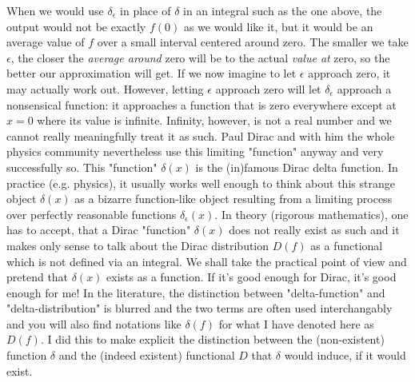 When we would use $\delta_{\epsilon}$ in place of $\delta$ in an integral such as the one above, the output would not be exactly $f(0)$ as we would like it, but it would be an average value of $f$ over a small interval centered around zero. The smaller we take $\epsilon$, the closer the \emph{average around} zero will be to the actual \emph{value at} zero, so the better our approximation will get. If we now imagine to let $\epsilon$ approach zero, it may actually work out. However, letting  $\epsilon$ approach zero will let $\delta_{\epsilon}$ approach a nonsensical function: it approaches a function that is zero everywhere except at $x=0$ where its value is infinite. Infinity, however, is not a real number and we cannot really meaningfully treat it as such. Paul Dirac and with him the whole physics community nevertheless use this limiting "function" anyway and very successfully so. This "function" $\delta(x)$ is the (in)famous Dirac delta function. In practice (e.g. physics), it usually works well enough to think about this strange object $\delta(x)$ as a bizarre function-like object resulting from a limiting process over perfectly reasonable functions $\delta_{\epsilon}(x)$. In theory (rigorous mathematics), one has to accept, that a Dirac "function"  $\delta(x)$ does not really exist as such and it makes only sense to talk about the Dirac distribution $D(f)$ as a functional which is not defined via an integral. We shall take the practical point of view and pretend that $\delta(x)$ exists as a function. If it's good enough for Dirac, it's good enough for me! In the literature, the distinction between "delta-function" and "delta-distribution" is blurred and the two terms are often used interchangably and you will also find notations like $\delta(f)$ for what I have denoted here as $D(f)$. I did this to make explicit the distinction between the (non-existent) function $\delta$ and the (indeed existent) functional $D$ that $\delta$ would induce, if it would exist.


